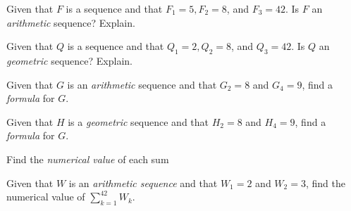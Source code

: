 \documentclass[12pt,fleqn]{exam}
\begin{document}
\begin{questions} 

\question Given that $F$ is a sequence and that $F_1 = 5, F_2 = 8$, and $F_3 = 42$.
Is $F$ an  \emph{arithmetic} sequence? Explain.

\begin{solution}[2.25in]

\end{solution}

\question Given that $Q$ is a sequence and that $Q_1 =2, Q_2 = 8$, and $Q_3 = 42$.
Is $Q$ an  \emph{geometric} sequence? Explain.

\begin{solution}[2.25in]

\end{solution}

\question Given that $G$ is an \emph{arithmetic} sequence and that $G_2 = 8$ and $G_4=9$, 
find a \emph{formula} for $G$.

\begin{solution}[2.25in]

\end{solution}
    
\question Given that $H$ is a \emph{geometric} sequence and that $H_2 = 8$ and $H_4=9$, 
find a \emph{formula} for $G$.

\begin{solution}[2.25in]

\end{solution}

\question Find the \emph{numerical value} of each sum

\question Given that $W$ is an \emph{arithmetic sequence} and that $W_1=2$ and $W_2 = 3$,
find the numerical value of $\displaystyle \sum_{k=1}^{42} W_k$. 


\end{questions}
\end{document}

